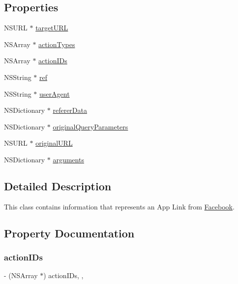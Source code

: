 \subsection*{Properties}
\begin{DoxyCompactItemize}
\item 
N\+S\+U\+RL $\ast$ \hyperlink{interfaceFBAppLinkData_a6a02329e6ff5458455083d7fb96e158f}{target\+U\+RL}
\item 
N\+S\+Array $\ast$ \hyperlink{interfaceFBAppLinkData_a3036ad4e5df77b1f88ebe291bf965e45}{action\+Types}
\item 
N\+S\+Array $\ast$ \hyperlink{interfaceFBAppLinkData_ab1e249332eecc908ce0a013a5019a6ae}{action\+I\+Ds}
\item 
N\+S\+String $\ast$ \hyperlink{interfaceFBAppLinkData_a8a2861774c5e2bafef797fed810c4a9b}{ref}
\item 
N\+S\+String $\ast$ \hyperlink{interfaceFBAppLinkData_a79148a205bca6e32895d00f68417d3d6}{user\+Agent}
\item 
N\+S\+Dictionary $\ast$ \hyperlink{interfaceFBAppLinkData_ae4ee9d19a5629c49fbfb878d7d170686}{referer\+Data}
\item 
N\+S\+Dictionary $\ast$ \hyperlink{interfaceFBAppLinkData_a25eb00238e87343dd7ff541a217c7947}{original\+Query\+Parameters}
\item 
N\+S\+U\+RL $\ast$ \hyperlink{interfaceFBAppLinkData_af7dfc879668b5e38c0deb35a536bfb92}{original\+U\+RL}
\item 
N\+S\+Dictionary $\ast$ \hyperlink{interfaceFBAppLinkData_aaeec19c18f1753dffad793d5cfd64f20}{arguments}
\end{DoxyCompactItemize}


\subsection{Detailed Description}
This class contains information that represents an App Link from \hyperlink{interfaceFacebook}{Facebook}. 

\subsection{Property Documentation}
\mbox{\label{interfaceFBAppLinkData_ab1e249332eecc908ce0a013a5019a6ae}} 
\subsubsection{\texorpdfstring{action\+I\+Ds}{actionIDs}}
{\footnotesize\ttfamily -\/ (N\+S\+Array $\ast$) action\+I\+Ds\hspace{0.3cm}{\ttfamily [read]}, {\ttfamily [atomic]}, {\ttfamily [assign]}}

